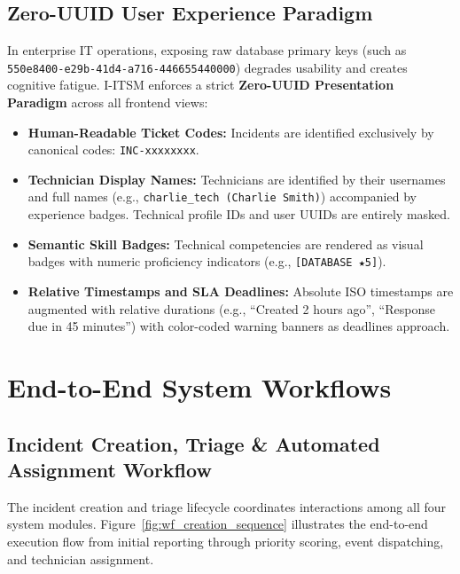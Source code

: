 \documentclass[11pt,a4paper,oneside]{report}
\begin{document}
\section{Zero-UUID User Experience Paradigm}
\label{sec:frontend_zero_uuid}
In enterprise IT operations, exposing raw database primary keys (such as \texttt{550e8400-e29b-41d4-a716-446655440000}) degrades usability and creates cognitive fatigue. I-ITSM enforces a strict \textbf{Zero-UUID Presentation Paradigm} across all frontend views:
\begin{itemize}
    \item \textbf{Human-Readable Ticket Codes:} Incidents are identified exclusively by canonical codes: \texttt{INC-xxxxxxxx}.
    \item \textbf{Technician Display Names:} Technicians are identified by their usernames and full names (e.g., \texttt{charlie\_tech (Charlie Smith)}) accompanied by experience badges. Technical profile IDs and user UUIDs are entirely masked.
    \item \textbf{Semantic Skill Badges:} Technical competencies are rendered as visual badges with numeric proficiency indicators (e.g., \texttt{[DATABASE ★5]}).
    \item \textbf{Relative Timestamps and SLA Deadlines:} Absolute ISO timestamps are augmented with relative durations (e.g., ``Created 2 hours ago'', ``Response due in 45 minutes'') with color-coded warning banners as deadlines approach.
\end{itemize}


\chapter{End-to-End System Workflows}
\label{ch:workflows}

\section{Incident Creation, Triage \& Automated Assignment Workflow}
\label{sec:wf_incident_creation}
The incident creation and triage lifecycle coordinates interactions among all four system modules. Figure~\ref{fig:wf_creation_sequence} illustrates the end-to-end execution flow from initial reporting through priority scoring, event dispatching, and technician assignment.
\end{document}
